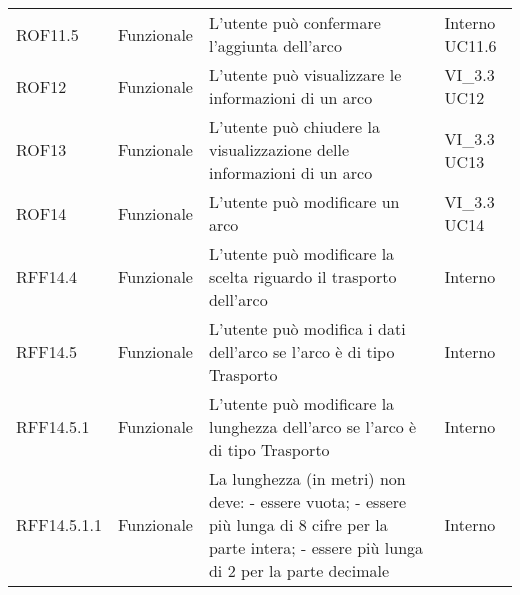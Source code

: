 \begin{longtable}{p{2cm}!{\VRule[1pt]}p{2cm}!{\VRule[1pt]}p{5cm}!{\VRule[1pt]}p{1.5cm}}
	\\
	ROF11.5                          & Funzionale\newline               & L'utente può confermare l'aggiunta dell'arco                                                                             & Interno \newline UC11.6      
	\\
	ROF12                            & Funzionale\newline               & L'utente può visualizzare le informazioni di un arco                                                                     & VI_3.3 \newline UC12         
	\\
	ROF13                            & Funzionale\newline               & L'utente può chiudere la visualizzazione delle informazioni di un arco                                                   & VI_3.3 \newline UC13         
	\\
	ROF14                            & Funzionale\newline               & L'utente può modificare un arco                                                                                          & VI_3.3 \newline UC14         
	\\
	RFF14.4                          & Funzionale\newline               & L'utente può modificare la scelta riguardo il trasporto dell'arco                                                        & Interno                      \\
	RFF14.5                          & Funzionale\newline               & L'utente può modifica i dati dell'arco se l'arco è di tipo Trasporto                                                    & Interno                      \\
	RFF14.5.1                        & Funzionale\newline               & L'utente può modificare la lunghezza dell'arco se l'arco è di tipo Trasporto                                            & Interno                      \\
	RFF14.5.1.1&Funzionale\newline  & La lunghezza (in metri) non deve:
	- essere vuota;
	- essere più lunga di 8 cifre per la parte intera;
	- essere più lunga di 2 per la parte decimale & Interno \\

\end{longtable}
